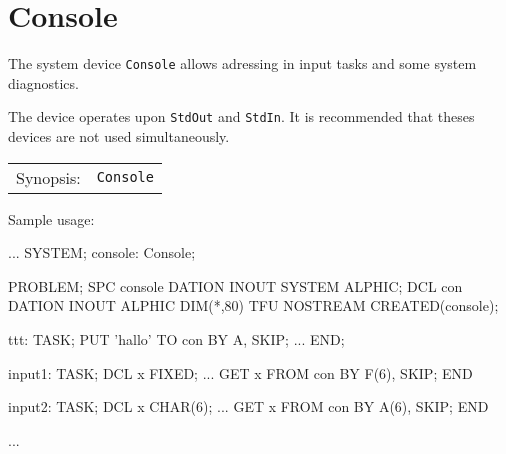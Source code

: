 \section{Console}
The system device \verb|Console| allows adressing in input tasks
and some system diagnostics.

The device operates upon \verb|StdOut| and \verb|StdIn|. 
It is recommended that theses devices are not used simultaneously.

\begin{tabular}{ll}
Synopsis: & \verb|Console| \\
\end{tabular}

Sample usage:
\begin{PEARLCode}
...
SYSTEM;
  console: Console;

PROBLEM;
   SPC console DATION INOUT SYSTEM ALPHIC;
   DCL con     DATION INOUT ALPHIC DIM(*,80) TFU NOSTREAM CREATED(console);

ttt: TASK;
   PUT 'hallo' TO con BY A, SKIP;
...
END;

input1: TASK;
   DCL x FIXED;
   ...
   GET x FROM con BY F(6), SKIP;
END

input2: TASK;
   DCL x CHAR(6);
   ...
   GET x FROM con BY A(6), SKIP;
END

...
\end{PEARLCode}


